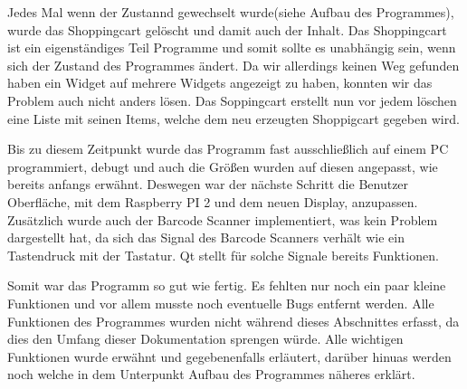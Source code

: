 \documentclass[11pt,a4paper]{article} %
\begin{document}
Jedes Mal wenn der Zustannd gewechselt wurde(siehe Aufbau des Programmes), wurde das Shoppingcart gelöscht und damit auch der Inhalt.
Das Shoppingcart ist ein eigenständiges Teil Programme und somit sollte es unabhängig sein, wenn sich der Zustand des Programmes ändert.
Da wir allerdings keinen Weg gefunden haben ein Widget auf mehrere Widgets angezeigt zu haben, konnten wir das Problem auch nicht anders lösen. Das Soppingcart erstellt nun vor jedem löschen eine Liste mit seinen Items, welche dem neu erzeugten Shoppigcart gegeben wird.
\par
Bis zu diesem Zeitpunkt wurde das Programm fast ausschließlich auf einem PC programmiert, debugt und auch die Größen wurden auf diesen angepasst, wie bereits anfangs erwähnt.
Deswegen war der nächste Schritt die Benutzer Oberfläche, mit dem Raspberry PI 2 und dem neuen Display, anzupassen.
Zusätzlich wurde auch der Barcode Scanner implementiert, was kein Problem dargestellt hat, da sich das Signal des Barcode Scanners verhält wie ein Tastendruck mit der Tastatur. Qt stellt für solche Signale bereits Funktionen.
\par
Somit war das Programm so gut wie fertig. Es fehlten nur noch ein paar kleine Funktionen und vor allem musste noch eventuelle Bugs entfernt werden.
Alle Funktionen des Programmes wurden nicht während dieses Abschnittes erfasst, da dies den Umfang dieser Dokumentation sprengen würde.
Alle wichtigen Funktionen wurde erwähnt und gegebenenfalls erläutert, darüber hinuas werden noch welche in dem Unterpunkt Aufbau des Programmes näheres erklärt.
\par
\end{document}
